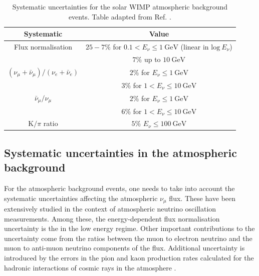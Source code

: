 \begin{table}[t]
	\caption[Systematic uncertainties for the solar WIMP atmospheric background events.]{Systematic uncertainties for the solar WIMP atmospheric background events. Table adapted from Ref. \cite{Super-Kamiokande2017}.}
	\begin{center}
		\begin{small}
			\begin{tabular}{c|c}
				Systematic                                            & Value \\[2mm] \hline
				\rule{0pt}{1.1\normalbaselineskip}Flux normalisation                                    & $25-7\%$ for $0.1 < E_{\nu} \leq 1~\mathrm{GeV}$ (linear in $\mathrm{log} ~ E_{\nu}$)\\[1mm] & $7\%$ up to $10~\mathrm{GeV}$ \\[2mm]
				$(\nu_{\mu}+\bar{\nu}_{\mu})/(\nu_{e}+\bar{\nu}_{e})$ & $2\%$ for $E_{\nu} \leq 1~\mathrm{GeV}$ \\[1mm] & $3\%$ for $1 < E_{\nu} \leq 10~\mathrm{GeV}$ \\[2mm]
				$\bar{\nu}_{\mu}/\nu_{\mu}$                           & $2\%$ for $E_{\nu} \leq 1~\mathrm{GeV}$ \\[1mm] & $6\%$ for $1 < E_{\nu} \leq 10~\mathrm{GeV}$ \\[2mm]
				$\mathrm{K}/\pi$ ratio                                & $5\%$ $E_{\nu} \leq 100~\mathrm{GeV}$
			\end{tabular}
		\end{small}
	\end{center}
	\label{tab:solar_dm_background_uncertainties}
\end{table}

\subsection{Systematic uncertainties in the atmospheric background}

For the atmospheric background events, one needs to take into account the systematic uncertainties affecting the atmospheric $\nu_{\mu}$ flux. These have been extensively studied in the context of atmospheric neutrino oscillation measurements. Among these, the energy-dependent flux normalisation uncertainty is the in the low energy regime. Other important contributions to the uncertainty come from the ratios between the muon to electron neutrino and the muon to anti-muon neutrino components of the flux. Additional uncertainty is introduced by the errors in the pion and kaon production rates calculated for the hadronic interactions of cosmic rays in the atmosphere \cite{Honda2006}.

